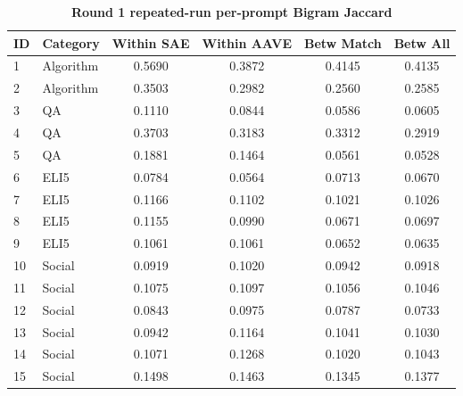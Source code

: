 \begin{table}[htbp]
\centering
\caption{\textbf{Round 1 repeated-run per-prompt Bigram Jaccard}}
\label{tab:round1-repeated-bigram-jaccard-per-prompt}
\renewcommand{\arraystretch}{1.4}
\begin{tabular}{|l|l|c|c|c|c|}
\hline
\textbf{ID} & \textbf{Category} & \textbf{Within SAE} & \textbf{Within AAVE} & \textbf{Betw Match} & \textbf{Betw All} \\
\hline
1 & Algorithm & 0.5690 & 0.3872 & 0.4145 & 0.4135 \\
\hline
2 & Algorithm & 0.3503 & 0.2982 & 0.2560 & 0.2585 \\
\hline
3 & QA & 0.1110 & 0.0844 & 0.0586 & 0.0605 \\
\hline
4 & QA & 0.3703 & 0.3183 & 0.3312 & 0.2919 \\
\hline
5 & QA & 0.1881 & 0.1464 & 0.0561 & 0.0528 \\
\hline
6 & ELI5 & 0.0784 & 0.0564 & 0.0713 & 0.0670 \\
\hline
7 & ELI5 & 0.1166 & 0.1102 & 0.1021 & 0.1026 \\
\hline
8 & ELI5 & 0.1155 & 0.0990 & 0.0671 & 0.0697 \\
\hline
9 & ELI5 & 0.1061 & 0.1061 & 0.0652 & 0.0635 \\
\hline
10 & Social & 0.0919 & 0.1020 & 0.0942 & 0.0918 \\
\hline
11 & Social & 0.1075 & 0.1097 & 0.1056 & 0.1046 \\
\hline
12 & Social & 0.0843 & 0.0975 & 0.0787 & 0.0733 \\
\hline
13 & Social & 0.0942 & 0.1164 & 0.1041 & 0.1030 \\
\hline
14 & Social & 0.1071 & 0.1268 & 0.1020 & 0.1043 \\
\hline
15 & Social & 0.1498 & 0.1463 & 0.1345 & 0.1377 \\
\hline
\end{tabular}
\end{table}
